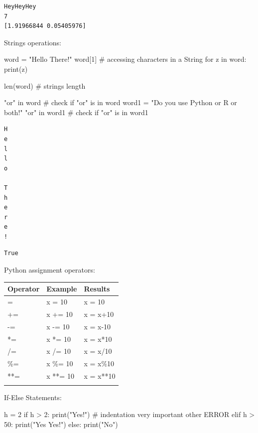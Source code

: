 \documentclass[
  letterpaper,
  DIV=11,
  numbers=noendperiod]{scrreprt}
\newenvironment{Shaded}{\begin{snugshade}}{\end{snugshade}}
\newcommand{\BuiltInTok}[1]{\textcolor[rgb]{0.00,0.23,0.31}{#1}}
\newcommand{\CommentTok}[1]{\textcolor[rgb]{0.37,0.37,0.37}{#1}}
\newcommand{\ControlFlowTok}[1]{\textcolor[rgb]{0.00,0.23,0.31}{#1}}
\newcommand{\DecValTok}[1]{\textcolor[rgb]{0.68,0.00,0.00}{#1}}
\newcommand{\KeywordTok}[1]{\textcolor[rgb]{0.00,0.23,0.31}{#1}}
\newcommand{\NormalTok}[1]{\textcolor[rgb]{0.00,0.23,0.31}{#1}}
\newcommand{\OperatorTok}[1]{\textcolor[rgb]{0.37,0.37,0.37}{#1}}
\newcommand{\StringTok}[1]{\textcolor[rgb]{0.13,0.47,0.30}{#1}}
\begin{document}
\begin{verbatim}
HeyHeyHey
7
[1.91966844 0.05405976]
\end{verbatim}

Strings operations:

\begin{Shaded}
\begin{Highlighting}[]
\NormalTok{word }\OperatorTok{=} \StringTok{"Hello There!"}
\NormalTok{word[}\DecValTok{1}\NormalTok{] }\CommentTok{\# accessing characters in a String}
\ControlFlowTok{for}\NormalTok{ z }\KeywordTok{in}\NormalTok{ word:}
  \BuiltInTok{print}\NormalTok{(z)}

\BuiltInTok{len}\NormalTok{(word) }\CommentTok{\# strings length}

\CommentTok{"or"} \KeywordTok{in}\NormalTok{ word }\CommentTok{\# check if "or" is in word}
\NormalTok{word1 }\OperatorTok{=} \StringTok{"Do you use Python or R or both!"}
\CommentTok{"or"} \KeywordTok{in}\NormalTok{ word1 }\CommentTok{\# check if "or" is in word1}
\end{Highlighting}
\end{Shaded}

\begin{verbatim}
H
e
l
l
o
 
T
h
e
r
e
!
\end{verbatim}

\begin{verbatim}
True
\end{verbatim}

Python assignment operators:

\begin{longtable}[]{@{}lll@{}}
\toprule\noalign{}
Operator & Example & Results \\
\midrule\noalign{}
\endhead
\bottomrule\noalign{}
\endlastfoot
= & x = 10 & x = 10 \\
+= & x += 10 & x = x+10 \\
-= & x -= 10 & x = x-10 \\
*= & x *= 10 & x = x*10 \\
/= & x /= 10 & x = x/10 \\
\%= & x \%= 10 & x = x\%10 \\
**= & x **= 10 & x = x**10 \\
& & \\
\end{longtable}

If-Else Statements:

\begin{Shaded}
\begin{Highlighting}[]
\NormalTok{h }\OperatorTok{=} \DecValTok{2}
\ControlFlowTok{if}\NormalTok{ h }\OperatorTok{\textgreater{}} \DecValTok{2}\NormalTok{:}
 \BuiltInTok{print}\NormalTok{(}\StringTok{"Yes!"}\NormalTok{) }\CommentTok{\# indentation very important other ERROR}
\ControlFlowTok{elif}\NormalTok{ h }\OperatorTok{\textgreater{}} \DecValTok{50}\NormalTok{:}
 \BuiltInTok{print}\NormalTok{(}\StringTok{"Yes Yes!"}\NormalTok{)}
\ControlFlowTok{else}\NormalTok{:}
  \BuiltInTok{print}\NormalTok{(}\StringTok{"No"}\NormalTok{)}
\end{Highlighting}
\end{Shaded}
\end{document}
